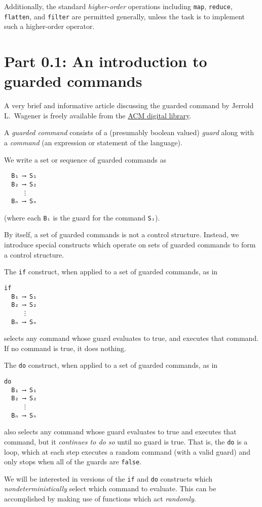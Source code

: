 \documentclass[11pt]{article}
\begin{document}
Additionally, the standard \emph{higher-order} operations
including \texttt{map}, \texttt{reduce}, \texttt{flatten}, and \texttt{filter} are permitted generally,
unless the task is to implement such a higher-order operator.

\section*{Part 0.1: An introduction to guarded commands}
\label{sec:orgf549d6d}
A very brief and informative article discussing the guarded command
by Jerrold L. Wagener is freely available
from the \href{https://dl.acm.org/doi/10.5555/1074100.1074433}{ACM digital library}.

A \emph{guarded command} consists of a (presumably boolean valued) \emph{guard} along
with a \emph{command} (an expression or statement of the language).

We write a set or sequence of guarded commands as
\begin{verbatim}
  B₁ ⟶ S₁
  B₂ ⟶ S₂
     ⋮
  Bₙ ⟶ Sₙ
\end{verbatim}
(where each \texttt{Bᵢ} is the guard for the command \texttt{Sᵢ}).

By itself, a set of guarded commands is not a control structure.
Instead, we introduce special constructs
which operate on sets of guarded commands to form a control structure.

The \texttt{if} construct, when applied to a set of guarded commands, as in
\begin{verbatim}
if
  B₁ ⟶ S₁
  B₂ ⟶ S₂
     ⋮
  Bₙ ⟶ Sₙ
\end{verbatim}
selects any command whose guard evaluates to true,
and executes that command.
If no command is true, it does nothing.

The \texttt{do} construct, when applied to a set of guarded commands, as in
\begin{verbatim}
do
  B₁ ⟶ S₁
  B₂ ⟶ S₂
     ⋮
  Bₙ ⟶ Sₙ
\end{verbatim}
also selects any command whose guard evaluates to true
and executes that command,
but it \emph{continues to do so} until no guard is true.
That is, the \texttt{do} is a loop, which at each step executes a random command
(with a valid guard) and only stops when all of the guards are \texttt{false}.

We will be interested in versions of the \texttt{if} and \texttt{do} constructs
which \emph{nondeterministically} select which command to evaluate.
This can be accomplished by making use of functions
which act \emph{randomly}.
\end{document}
